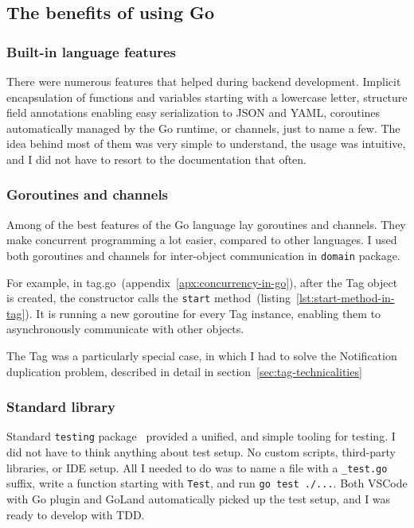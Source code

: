 \subsection{The benefits of using Go}\label{sec:the-benefits-of-using-go}

\subsubsection{Built-in language features}\label{sec:built-in-language-features}

There were numerous features
that helped during backend development.
Implicit encapsulation of functions and variables
starting with a lowercase letter,
structure field annotations
enabling easy serialization
to \ac{JSON} and \ac{YAML},
coroutines automatically managed by the Go runtime,
or channels,
just to name a few.
The idea behind most of them
was very simple to understand,
the usage was intuitive,
and I did not have to resort to the documentation that often.

\subsubsection{Goroutines and channels}\label{sec:goroutines-and-channels}

Among of the best features of the Go language lay goroutines and channels.
They make concurrent programming a lot easier, compared to other languages.
I used both goroutines and channels
for inter-object communication in \texttt{domain} package.

For example, in {tag.go}~(appendix~\ref{apx:concurrency-in-go}),
after the Tag object is created,
the constructor calls
the \texttt{start} method~(listing~\ref{lst:start-method-in-tag}).
It is running a new goroutine for every Tag instance,
enabling them to asynchronously communicate with other objects.

The Tag was a particularly special case,
in which I had to solve
the Notification duplication problem,
described in detail in section~\ref{sec:tag-technicalities}

\subsubsection{Standard library}\label{sec:standard-library}

Standard \texttt{testing} package~\cite{cox_testing_2022} provided
a unified, and simple tooling for testing.
I did not have to think anything about test setup.
No custom scripts, third-party libraries, or \ac{IDE} setup.
All I needed to do was to name a file with a \texttt{\_test.go} suffix,
write a function starting with \texttt{Test},
and run \texttt{go\ test\ ./...}.
Both \ac{VSCode} with Go plugin and GoLand
automatically picked up the test setup,
and I was ready to develop with \ac{TDD}.

